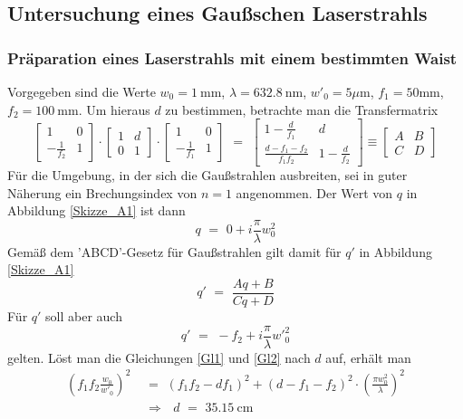 \documentclass[11pt,a4paper,oneside]{scrartcl}
\begin{document}
\subsection{Untersuchung eines Gaußschen Laserstrahls}
\subsubsection{Präparation eines Laserstrahls mit einem bestimmten Waist}
Vorgegeben sind die Werte $w_0 = 1\ \mathrm{mm}$, $\lambda = 632.8\ \mathrm{nm}$, ${w'}_0 = 5 \mu \mathrm m$, $f_1 = 50\mathrm{mm}$, $f_2 = 100\ \mathrm{mm}$. Um hieraus $d$ zu bestimmen, betrachte man die Transfermatrix
\begin{equation}
\begin{bmatrix}
    1 & 0 \\
    -\frac{1}{f_2} & 1 
\end{bmatrix}
\cdot
 \begin{bmatrix}
    1 & d \\
    0 & 1 
\end{bmatrix}
\cdot
 \begin{bmatrix}
    1 & 0 \\
    -\frac{1}{f_1} & 1 
\end{bmatrix}
\,\,=\,\,
 \begin{bmatrix}
   1-\frac{d}{f_1} & d \\
    \frac{d-f_1-f_2}{f_1 f_2} & 1-\frac{d}{f_2} 
\end{bmatrix}
\equiv
 \begin{bmatrix}
   A & B \\
    C & D 
\end{bmatrix}
\end{equation}
Für die Umgebung, in der sich die Gaußstrahlen ausbreiten, sei in guter Näherung ein Brechungsindex von $n=1$ angenommen. Der Wert von $q$ in Abbildung \ref{Skizze_A1} ist dann
\begin{equation}
q \,\,=\,\, 0 + i \frac{\pi}{\lambda} w_{0}^2
\end{equation}
Gemäß dem 'ABCD'-Gesetz für Gaußstrahlen gilt damit für $q'$ in Abbildung \ref{Skizze_A1}
\begin{equation}\label{Gl1}
q' \,\,=\,\, \frac{Aq+B}{Cq+D}
\end{equation}
Für $q'$ soll aber auch
\begin{equation}\label{Gl2}
q' \,\,=\,\, -f_2 + i \frac{\pi}{\lambda} {w'}_{0}^{2}
\end{equation}
gelten. Löst man die Gleichungen \ref{Gl1} und \ref{Gl2} nach $d$ auf, erhält man
\begin{align}
\left( f_1 f_2 \frac{w_0}{{w'}_{0}} \right)^2 \,\,&=\,\, \left( f_1 f_2 - d f_1 \right)^2 + \left( d - f_1 - f_2 \right)^2 \cdot \left(\frac{\pi w_{0}^{2}}{\lambda} \right)^2\\ \quad&
\Rightarrow \,\,\,\, d \,\,=\,\, 35.15\ \mathrm{cm}
\end{align}
\end{document}
